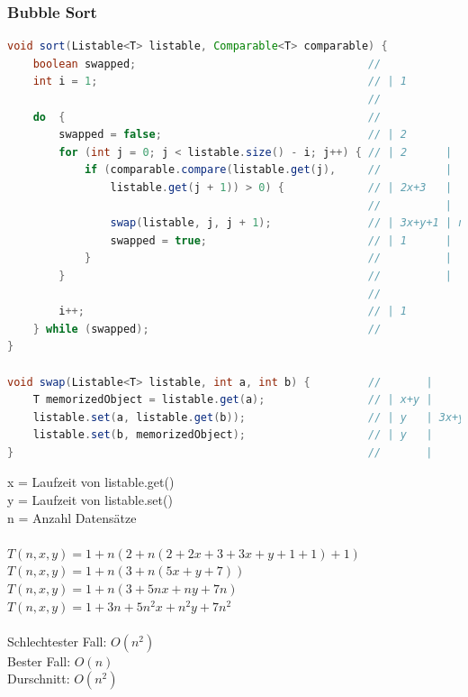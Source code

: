 \documentclass[a4paper, 11pt]{article}
\begin{document}
\subsubsection*{Bubble Sort}

\begin{lstlisting}[language=java]
void sort(Listable<T> listable, Comparable<T> comparable) {
    boolean swapped;                                    //
    int i = 1;                                          // | 1
                                                        //
    do  {                                               //              |
        swapped = false;                                // | 2          |
        for (int j = 0; j < listable.size() - i; j++) { // | 2      |   |
            if (comparable.compare(listable.get(j),     //          |   |
                listable.get(j + 1)) > 0) {             // | 2x+3   |   |
                                                        //          |   |
                swap(listable, j, j + 1);               // | 3x+y+1 | n | n
                swapped = true;                         // | 1      |   |
            }                                           //          |   |
        }                                               //          |   |
                                                        //              |
        i++;                                            // | 1          |
    } while (swapped);                                  //              |
}

void swap(Listable<T> listable, int a, int b) {         //       |
    T memorizedObject = listable.get(a);                // | x+y |
    listable.set(a, listable.get(b));                   // | y   | 3x+y
    listable.set(b, memorizedObject);                   // | y   |
}                                                       //       |
\end{lstlisting}
x = Laufzeit von listable.get() \\
y = Laufzeit von listable.set() \\
n = Anzahl Datensätze \\
\ \\
\( T(n, x, y) = 1 + n(2 + n(2 + 2x + 3 + 3x + y + 1 + 1) + 1) \) \\
\( T(n, x, y) = 1 + n(3 + n(5x + y + 7)) \) \\
\( T(n, x, y) = 1 + n(3 + 5nx + ny + 7n) \) \\
\( T(n, x, y) = 1 + 3n + 5n^2x + n^2y + 7n^2 \) \\
\ \\
Schlechtester Fall:      \( O(n^2) \) \\
Bester Fall:             \( O(n) \)   \\
Durschnitt:              \( O(n^2) \) \\
\end{document}
